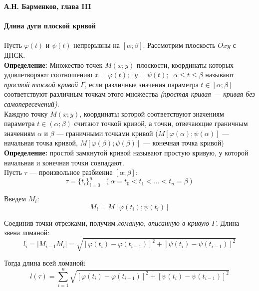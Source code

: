 \documentclass{article}
\begin{document}
  \Huge\textbf{А.Н. Барменков, глава III}\normalsize\\\\

  \huge\textbf{Длина дуги плоской кривой}\normalsize\\\\
  
  Пусть $\varphi(t)$ и $\psi(t)$ непрерывны на $[\alpha;\beta]$. Рассмотрим плоскость $Oxy$ с ДПСК.\\
  
  \textbf{Определение:} Множество точек $M(x;y)$ плоскости, координаты которых удовлетворяют соотношению $x=\varphi(t);\;\;y=\psi(t);\;\;\alpha\leq t\leq\beta$ называют \textit{простой плоской кривой} $\Gamma$, если различные значения параметра $t\in[\alpha;\beta]$ соответствуют различным точкам этого множества \textit{(простая кривая --- кривая без самопересечений)}.\\
  
  Каждую точку $M(x;y)$, координаты которой соответствуют значениям параметра $t\in(\alpha;\beta)$ считают точкой кривой, а точки, отвечающие граничным значениям $\alpha$ и $\beta$ --- граничными точками кривой ($M[\varphi(\alpha);\psi(\alpha)]$ --- начальная точка кривой, $M[\varphi(\beta);\psi(\beta)]$ --- конечная точка кривой)\\
  
  \textbf{Определение:} простой замкнутой кривой называют простую кривую, у которой начальная и конечная точки совпадают.\\
  
  Пусть $\tau$ --- произвольное разбиение $[\alpha;\beta]$:
  \begin{equation}
    \tau=\{t_i\}^n_{i=0}\;\;(\alpha=t_0<t_1<...<t_n=\beta)
  \end{equation}
  
  Введем $M_i$:
  \begin{equation}
    M_i=M[\varphi(t_i);\psi(t_i)]
  \end{equation}
  
  Соединив точки отрезками, получим \textit{ломаную, вписанную в кривую $\Gamma$.} Длина звена ломаной:
  \begin{equation}
    l_i=|M_{i-1}M_i|=\sqrt{[\varphi(t_i)-\varphi(t_{i-1})]^2+[\psi(t_i)-\psi(t_{i-1})]^2}
  \end{equation}
  
  Тогда длина всей ломаной:
  \begin{equation}
    l(\tau)=\sum_{i=1}^n\sqrt{[\varphi(t_i)-\varphi(t_{i-1})]^2+[\psi(t_i)-\psi(t_{i-1})]^2}
  \end{equation}
  
\end{document}
